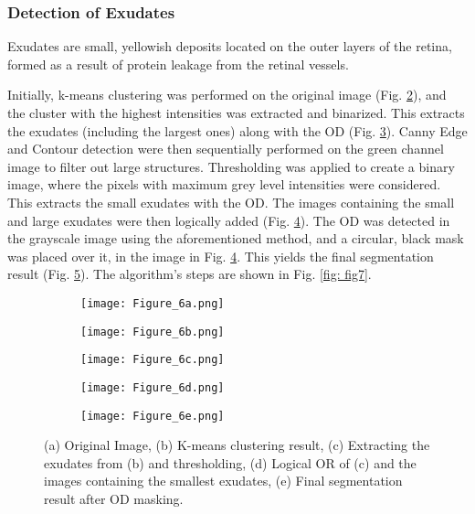 \documentclass{svproc}
\begin{document}
\vspace{-4mm}
\subsubsection{Detection of Exudates}

Exudates are small, yellowish deposits located on the outer layers of the retina, formed as a result of protein leakage from the retinal vessels.

Initially, k-means clustering was performed on the original image (Fig. \ref{fig: fig6b}), and the cluster with the highest intensities was extracted and binarized. This extracts the exudates (including the largest ones) along with the OD (Fig. \ref{fig: fig6c}). Canny Edge \cite{canny} and Contour detection were then sequentially performed on the green channel image to filter out large structures. Thresholding was applied to create a binary image, where the pixels with maximum grey level intensities were considered. This extracts the small exudates with the OD. The images containing the small and large exudates were then logically added (Fig. \ref{fig: fig6d}). The OD was detected in the grayscale image using the aforementioned method, and a circular, black mask was placed over it, in the image in Fig. \ref{fig: fig6d}. This yields the final segmentation result (Fig. \ref{fig: fig6e}). The algorithm's steps are shown in Fig. \ref{fig: fig7}.


\begin{figure}
     \centering
     \begin{subfigure}[b]{0.19\textwidth}
         \centering
         \texttt{[image: Figure\_6a.png]}
         \caption{}
         \label{fig: fig6a}
     \end{subfigure}
     \hfill
     \begin{subfigure}[b]{0.19\textwidth}
         \centering
         \texttt{[image: Figure\_6b.png]}
         \caption{}
         \label{fig: fig6b}
     \end{subfigure}
     \hfill
     \begin{subfigure}[b]{0.19\textwidth}
         \centering
         \texttt{[image: Figure\_6c.png]}
         \caption{}
         \label{fig: fig6c}
     \end{subfigure}
     \hfill
     \begin{subfigure}[b]{0.19\textwidth}
         \centering
         \texttt{[image: Figure\_6d.png]}
         \caption{}
         \label{fig: fig6d}
     \end{subfigure}
     \begin{subfigure}[b]{0.19\textwidth}
         \centering
         \texttt{[image: Figure\_6e.png]}
         \caption{}
         \label{fig: fig6e}
     \end{subfigure}
     \caption{(a) Original Image, (b) K-means clustering result, (c) Extracting the exudates from (b) and thresholding, (d) Logical OR of (c) and the images containing the smallest exudates, (e) Final segmentation result after OD masking.}
     \label{fig: fig6}
\end{figure}
\end{document}
